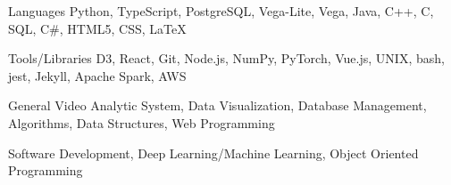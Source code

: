 

\begin{cvskills}

  \cvskill
    {Languages} %
    {Python, TypeScript, PostgreSQL, Vega-Lite, Vega, Java, C++, C, SQL, C\#, HTML5, CSS, LaTeX} %

  \cvskill
    {Tools/Libraries} %
    {D3, React, Git, Node.js, NumPy, PyTorch, Vue.js, UNIX, bash, jest, Jekyll, Apache Spark, AWS} %

  \cvskill
    {General} %
    {Video Analytic System, Data Visualization, Database Management, Algorithms, Data Structures, Web Programming} %

  \cvskill
    {} %
    {Software Development, Deep Learning/Machine Learning, Object Oriented Programming} %

\end{cvskills}
